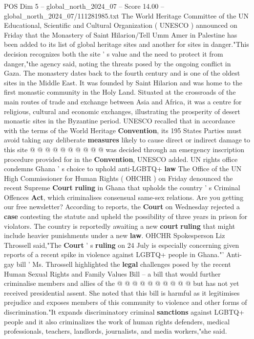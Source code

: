 \begin{textsample}{POS Dim 5 – global\_north\_2024\_07 – Score 14.00 – global\_north\_2024\_07/111281985.txt}  \label{ex:f5_pos_305}
The World Heritage Committee of the UN Educational, Scientific and Cultural Organization ( UNESCO ) announced on Friday that the Monastery of Saint Hilarion/Tell Umm Amer in Palestine has been added to its list of global heritage sites and another for sites in danger."This decision recognizes both the site ' s value and the need to protect it from danger,"the agency said, noting the threats posed by the ongoing conflict in Gaza.
The monastery dates back to the fourth century and is one of the oldest sites in the Middle East.
It was founded by Saint Hilarion and was home to the first monastic community in the Holy Land.
Situated at the crossroads of the main routes of trade and exchange between Asia and Africa, it was a centre for religious, cultural and economic exchanges, illustrating the prosperity of desert monastic sites in the Byzantine period.
UNESCO recalled that in accordance with the terms of the World Heritage \textbf{Convention}, its 195 States Parties must avoid taking any deliberate \textbf{measures} likely to cause direct or indirect damage to this site @ @ @ @ @ @ @ @ @ @ was decided through an emergency inscription procedure provided for in the \textbf{Convention}, UNESCO added.
UN rights office condemns Ghana ' s choice to uphold anti-LGBTQ+ \textbf{law} The Office of the UN High Commissioner for Human Rights ( OHCHR ) on Friday denounced the recent Supreme \textbf{Court} \textbf{ruling} in Ghana that upholds the country ' s Criminal Offences \textbf{Act}, which criminalises consensual same-sex relations.
Are you getting our free newsletter?
According to reports, the \textbf{Court} on Wednesday rejected a \textbf{case} contesting the statute and upheld the possibility of three years in prison for violators.
The country is reportedly awaiting a new \textbf{court} \textbf{ruling} that might include heavier punishments under a new \textbf{law}.
OHCHR Spokesperson Liz Throssell said,"The \textbf{Court} ' s \textbf{ruling} on 24 July is especially concerning given reports of a recent spike in violence against LGBTQ+ people in Ghana."' Anti-gay bill ' Ms.
Throssell highlighted the \textbf{legal} challenges posed by the recent Human Sexual Rights and Family Values Bill -- a bill that would further criminalise members and allies of the @ @ @ @ @ @ @ @ @ @ but has not yet received presidential assent.
She noted that this bill is harmful as it legitimises prejudice and exposes members of this community to violence and other forms of discrimination."It expands discriminatory criminal \textbf{sanctions} against LGBTQ+ people and it also criminalizes the work of human rights defenders, medical professionals, teachers, landlords, journalists, and media workers,"she said.

\end{textsample}
